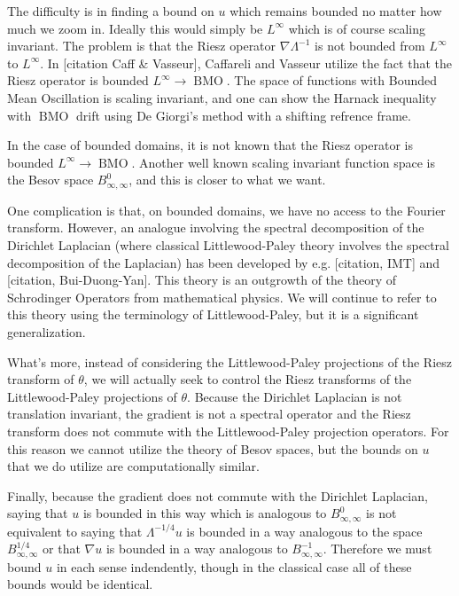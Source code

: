 \documentclass[11pt]{amsart}
\theoremstyle{remark}
\theoremstyle{definition}
\DeclareMathOperator{\BMO}{BMO}
\newcommand{\grad}{\nabla}
\begin{document}
The difficulty is in finding a bound on $u$ which remains bounded no matter how much we zoom in.  Ideally this would simply be $L^\infty$ which is of course scaling invariant.  The problem is that the Riesz operator $\grad \Lambda^{-1}$ is not bounded from $L^\infty$ to $L^\infty$.  In [citation Caff \& Vasseur], Caffareli and Vasseur utilize the fact that the Riesz operator is bounded $L^\infty \to \BMO$.  The space of functions with Bounded Mean Oscillation is scaling invariant, and one can show the Harnack inequality with $\BMO$ drift using De Giorgi's method with a shifting refrence frame.  

In the case of bounded domains, it is not known that the Riesz operator is bounded $L^\infty \to \BMO$.  Another well known scaling invariant function space is the Besov space $B^0_{\infty,\infty}$, and this is closer to what we want.  

One complication is that, on bounded domains, we have no access to the Fourier transform.  However, an analogue involving the spectral decomposition of the Dirichlet Laplacian (where classical Littlewood-Paley theory involves the spectral decomposition of the Laplacian) has been developed by e.g. [citation, IMT] and [citation, Bui-Duong-Yan].  This theory is an outgrowth of the theory of Schrodinger Operators from mathematical physics.  We will continue to refer to this theory using the terminology of Littlewood-Paley, but it is a significant generalization.  

What's more, instead of considering the Littlewood-Paley projections of the Riesz transform of $\theta$, we will actually seek to control the Riesz transforms of the Littlewood-Paley projections of $\theta$.  Because the Dirichlet Laplacian is not translation invariant, the gradient is not a spectral operator and the Riesz transform does not commute with the Littlewood-Paley projection operators.  For this reason we cannot utilize the theory of Besov spaces, but the bounds on $u$ that we do utilize are computationally similar.  

Finally, because the gradient does not commute with the Dirichlet Laplacian, saying that $u$ is bounded in this way which is analogous to $B^0_{\infty,\infty}$ is not equivalent to saying that $\Lambda^{-1/4} u$ is bounded in a way analogous to the space $B^{1/4}_{\infty,\infty}$ or that $\grad u$ is bounded in a way analogous to $B^{-1}_{\infty,\infty}$.  Therefore we must bound $u$ in each sense indendently, though in the classical case all of these bounds would be identical.  
\end{document}

